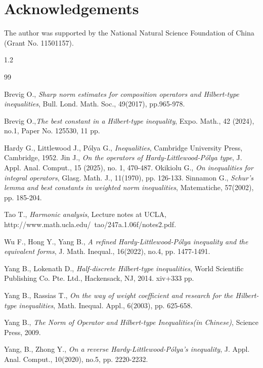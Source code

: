 \documentclass[10pt]{amsart}
\theoremstyle{definition}    %
\numberwithin{equation}{section}
\begin{document}
\section{{\bf Acknowledgements}}
The author was supported by the National Natural Science Foundation of China (Grant No. 11501157).
\begin{spacing}{1.2} %
\begin{thebibliography}{99}

Brevig O., {\em Sharp norm estimates for composition operators and Hilbert-type inequalities}, Bull. Lond. Math. Soc., 49(2017), pp.965-978.

Brevig O.,{\em The best constant in a Hilbert-type inequality}, Expo. Math.,  42 (2024), no.1, Paper No. 125530, 11 pp.
 
Hardy  G., Littlewood J., P\'{o}lya G., {\em Inequalities}, Cambridge University Press, Cambridge, 1952.
 Jin J., {\em On the operators of Hardy-Littlewood-Pólya type}, J. Appl. Anal. Comput., 15 (2025), no. 1, 470-487.
Okikiolu G., {\em On inequalities for integral operators}, Glasg. Math. J., 11(1970), pp. 126-133.
Sinnamon G., {\em Schur’s lemma and best constants in weighted norm inequalities}, Matematiche, 57(2002), pp. 185-204.

Tao T., {\em Harmonic analysis}, Lecture notes at UCLA, \\http://www.math.ucla.edu/~tao/247a.1.06f/notes2.pdf.

Wu F., Hong Y., Yang B., {\em A refined Hardy-Littlewood-P\'{o}lya inequality and the equivalent forms}, J. Math. Inequal., 16(2022), no.4, pp. 1477-1491. 

Yang B., Lokenath D., {\em Half-discrete Hilbert-type inequalities}, World Scientific Publishing Co. Pte. Ltd., Hackensack, NJ, 2014. xiv+333 pp.
 
Yang B., Rassias T., {\em On the way of weight coefficient and research for the Hilbert-type inequalities}, Math. Inequal. Appl., 6(2003), pp. 625-658.

Yang B., {\em The Norm of Operator and Hilbert-type Inequalities(in Chinese)}, Science Press, 2009.

Yang, B., Zhong Y., {\em On a reverse Hardy-Littlewood-P\'{o}lya's inequality}, J. Appl. Anal. Comput., 10(2020), no.5, pp. 2220-2232.


\end{thebibliography}
\end{spacing}
\end{document}
